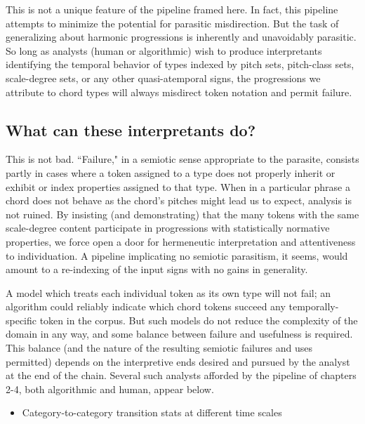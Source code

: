 This is not a unique feature of the pipeline framed here.  In fact, this pipeline attempts to minimize the potential for parasitic misdirection.  But the task of generalizing about harmonic progressions is inherently and unavoidably parasitic. So long as analysts (human or algorithmic) wish to produce interpretants identifying the temporal behavior of types indexed by pitch sets, pitch-class sets, scale-degree sets, or any other quasi-atemporal signs, the progressions we attribute to chord types will always misdirect token notation and permit failure.

\subsection{What can these interpretants do?}
This is not bad.  ``Failure," in a semiotic sense appropriate to the parasite, consists partly in cases where a token assigned to a type does not properly inherit or exhibit or index properties assigned to that type.  When in a particular phrase a chord does not behave as the chord's pitches might lead us to expect, analysis is not ruined.  By insisting (and demonstrating) that the many tokens with the same scale-degree content participate in progressions with statistically normative properties, we force open a door for hermeneutic interpretation and attentiveness to individuation.  A pipeline implicating no semiotic parasitism, it seems, would amount to a re-indexing of the input signs with no gains in generality.

A model which treats each individual token as its own type will not fail; an algorithm could reliably indicate which chord tokens succeed any temporally-specific token in the corpus.  But such models do not reduce the complexity of the domain in any way, and some balance between failure and usefulness is required.  This balance (and the nature of the resulting semiotic failures and uses permitted) depends on the interpretive ends desired and pursued by the analyst at the end of the chain.  Several such analysts afforded by the pipeline of chapters 2-4, both algorithmic and human, appear below.

\begin{itemize}
	\item Category-to-category transition stats at different time scales
\end{itemize}

